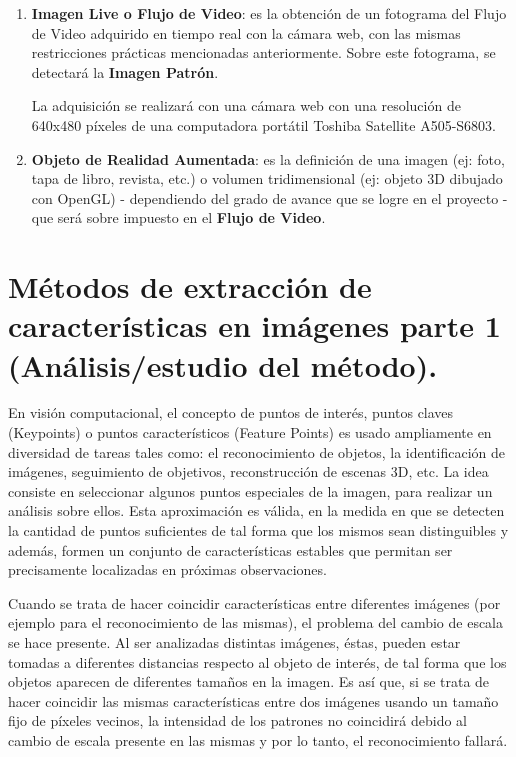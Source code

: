 \documentclass[a4paper,11pt,spanish]{article}
\begin{document}
\begin{enumerate}
  \item \textbf{Imagen Live o Flujo de Video}: es la obtención de un fotograma del Flujo de Video adquirido en tiempo real con la cámara web, con las mismas restricciones prácticas mencionadas anteriormente. Sobre este fotograma, se detectará la \textbf{Imagen Patrón}.

  La adquisición se realizará con una cámara web con una resolución de 640x480 píxeles de una computadora portátil Toshiba Satellite A505-S6803.
  
  \item \textbf{Objeto de Realidad Aumentada}: es la definición de una imagen (ej: foto, tapa de libro, revista, etc.) o volumen tridimensional (ej: objeto 3D dibujado con OpenGL) - dependiendo del grado de avance que se logre en el proyecto - que será sobre impuesto en el \textbf{Flujo de Video}.
  
\end{enumerate}


% 
\section{Métodos de extracción de características en imágenes parte 1 (Análisis/estudio del método).}

En visión computacional, el concepto de puntos de interés, puntos claves (Keypoints) o puntos característicos (Feature Points) es usado ampliamente en diversidad de tareas tales como: el reconocimiento de objetos, la identificación de imágenes, seguimiento de objetivos, reconstrucción de escenas 3D, etc. La idea consiste en  seleccionar algunos puntos especiales de la imagen, para realizar un análisis sobre ellos. Esta aproximación es válida, en la medida en que se detecten la cantidad de puntos suficientes de tal forma que los mismos sean distinguibles y además, formen un conjunto de características estables que permitan ser precisamente localizadas en próximas observaciones.

Cuando se trata de hacer coincidir características entre diferentes imágenes (por ejemplo para el reconocimiento de las mismas), el problema del cambio de escala se hace presente. Al ser analizadas distintas imágenes, éstas,
pueden estar tomadas a diferentes distancias respecto al objeto de interés, de tal forma que los objetos aparecen de diferentes tamaños en la imagen. Es así que, si se trata de hacer coincidir las mismas características entre dos imágenes usando un tamaño fijo de píxeles vecinos, la intensidad de los patrones no coincidirá debido al cambio de escala presente en las mismas y por lo tanto, el reconocimiento fallará.
\end{document}
